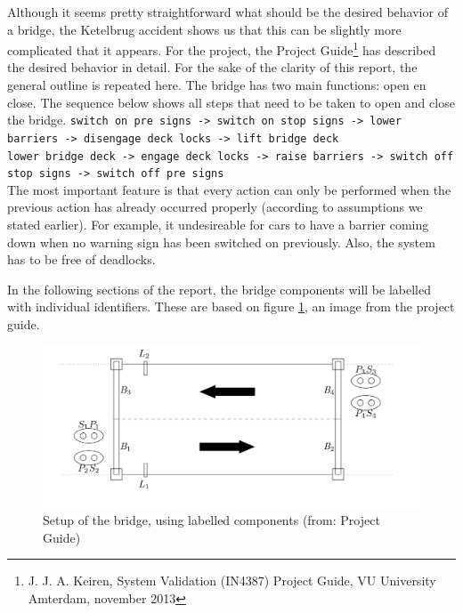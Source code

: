 Although it seems pretty straightforward what should be the desired behavior of a bridge, the Ketelbrug accident shows us that this can be slightly more complicated that it appears. For the project, the Project Guide\footnote{J. J. A. Keiren, System Validation (IN4387) Project Guide, VU University Amterdam, november 2013} has described the desired behavior in detail. For the sake of the clarity of this report, the general outline is repeated here. The bridge has two main functions: open en close. The sequence below shows all steps that need to be taken to open and close the bridge.
%
\begingroup
\footnotesize
\vspace{+10pt}
\texttt{switch on pre signs -> switch on stop signs -> lower barriers -> disengage deck locks -> lift bridge deck}\\
\endgroup
%
\begingroup
\footnotesize
\vspace{+10pt}
\texttt{lower bridge deck -> engage deck locks -> raise barriers -> switch off stop signs -> switch off pre signs}\\
\vspace{+10pt}
\label{close}
\endgroup
%
The most important feature is that every action can only be performed when the previous action has already occurred properly (according to assumptions we stated earlier). For example, it undesireable for cars to have a barrier coming down when no warning sign has been switched on previously. Also, the system has to be free of deadlocks. 

In the following sections of the report, the bridge components will be labelled with individual identifiers. These are based on figure \ref{fig:setup}, an image from the project guide. 
%
\begin{figure}[htb]%
\includegraphics[width=\columnwidth]{Images/Setup.png}%
\caption{Setup of the bridge, using labelled components (from: Project Guide)}%
\label{fig:setup}%
\end{figure}
%

\newpage